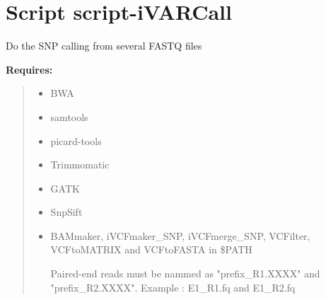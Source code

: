 %
%
%


\section{Script script-iVARCall}

    \label{script-iVARCall}
Do the SNP calling from several FASTQ files

\textbf{Requires:}
\begin{quote}
  \begin{itemize}

  \item
    \setlength{\parskip}{0.6ex}
BWA



  \item samtools



  \item picard-tools



  \item Trimmomatic



  \item GATK



  \item SnpSift



  \item BAMmaker, iVCFmaker\_SNP, iVCFmerge\_SNP, VCFilter, VCFtoMATRIX and 
VCFtoFASTA in \$PATH

Paired-end reads must be nammed as "prefix\_R1.XXXX" and "prefix\_R2.XXXX".
Example : E1\_R1.fq and E1\_R2.fq



\end{itemize}

\end{quote}



